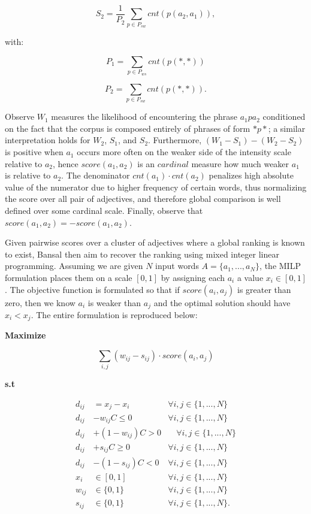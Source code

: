 \documentclass[11pt,letterpaper]{article}
\begin{document}
\[ S_2 = \frac{1}{P_2} \sum_{p \in P_{sw}} cnt(p(a_2, a_1)),\]

with:

\[ P_1 = \sum_{p \in P_{ws}} cnt(p(*, *))\]

\[ P_2 = \sum_{p \in P_{sw}} cnt(p(*, *)).\]


Observe $W_1$ measures the likelihood of encountering the phrase $a_1 p a_2$ conditioned on the fact that the corpus is composed 
entirely of phrases of form $* p *$; a similar interpretation holds for $W_2$, $S_1$, and $S_2$. Furthermore, $(W_1 - S_1) - (W_2 - S_2)$ is positive when $a_1$ occurs more often on the weaker side of the intensity scale relative to $a_2$, hence $score(a_1, a_2)$ is an $cardinal$ measure how much weaker $a_1$ is relative to $a_2$. The denominator $cnt(a_1) \cdot cnt(a_2)$ penalizes high absolute value of the numerator due to higher frequency of certain words, thus normalizing the score over all pair of adjectives, and therefore global comparison is well defined over some cardinal scale. Finally, observe that $score(a_1, a_2) = - score(a_1, a_2)$.

Given pairwise scores over a cluster of adjectives where a global ranking is known to exist, Bansal then aim to recover the ranking using mixed integer linear programming. Assuming we are given $N$ input words $A = \{a_1, ..., a_N\}$, the MILP formulation places them on a scale $[0,1]$ by assigning each $a_i$ a value $x_i \in [0,1]$. The objective function is formulated so that if $score(a_i, a_j)$ is greater than zero, then we know $a_i$ is weaker than $a_j$ and the optimal solution should have $x_i < x_j$. The entire formulation is reproduced below:

{\bf Maximize}

\[ \sum_{i,j} (w_{ij} - s_{ij}) \cdot score(a_i, a_j)\]

{\bf s.t}

\begin{align*}
  d_{ij} &= x_j - x_i          &\forall i,j \in \{1,...,N\}\\
  d_{ij} &- w_{ij}C \leq 0     &\forall i,j \in \{1,...,N\}\\
  d_{ij} &+ (1 - w_{ij})C > 0  &\quad \forall i,j \in \{1,...,N\}\\
  d_{ij} &+ s_{ij}C \geq 0     &\forall i,j \in \{1,...,N\}\\
  d_{ij} &- (1 - s_{ij})C < 0  &\forall i,j \in \{1,...,N\}\\
  x_i    &\in [0,1]            &\forall i,j \in \{1,...,N\}\\
  w_{ij} &\in \{0,1\}          &\forall i,j \in \{1,...,N\}\\
  s_{ij} &\in \{0,1\}          &\forall i,j \in \{1,...,N\}.
\end{align*}
\end{document}

